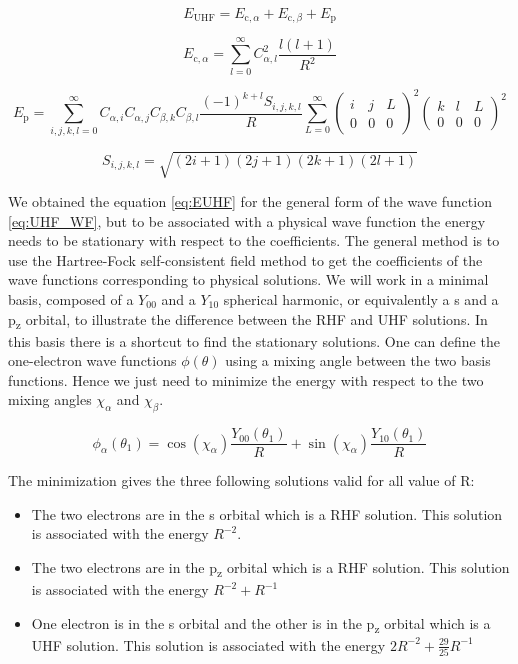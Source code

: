 \documentclass[11pt,a4paper]{article}
\begin{document}
\begin{equation}
E_{\text{UHF}} = E_{\text{c},\alpha} + E_{\text{c},\beta} + E_{\text{p}}
\end{equation}

\begin{equation}
E_{\text{c},\alpha} = \sum\limits_{l=0}^{\infty} C_{\alpha,l}^2 \frac{l(l+1)}{R^2}
\end{equation}

\begin{equation}
E_{\text{p}} = \sum\limits_{i,j,k,l=0}^{\infty}C_{\alpha,i}C_{\alpha,j}C_{\beta,k}C_{\beta,l} \frac{(-1)^{k+l}S_{i,j,k,l}}{R}\sum\limits_{L=0}^{\infty} \begin{pmatrix}
 i & j & L \\
 0 & 0 & 0
\end{pmatrix}^2 \begin{pmatrix}
 k & l & L \\
 0 & 0 & 0
\end{pmatrix}^2
\label{eq:EUHF}
\end{equation}

\begin{equation*}
S_{i,j,k,l}=\sqrt{(2i+1)(2j+1)(2k+1)(2l+1)}
\end{equation*}

We obtained the equation \eqref{eq:EUHF} for the general form of the wave function \eqref{eq:UHF_WF}, but to be associated with a physical wave function the energy needs to be stationary with respect to the coefficients. The general method is to use the Hartree-Fock self-consistent field method \cite{SzaboBook} to get the coefficients of the wave functions corresponding to physical solutions. We will work in a minimal basis, composed  of a $Y_{00}$ and a $Y_{10}$ spherical harmonic, or equivalently a s and a p\textsubscript{z} orbital, to illustrate the difference between the RHF and UHF solutions. In this basis there is a shortcut to find the stationary solutions. One can define the one-electron wave functions $\phi(\theta)$ using a mixing angle between the two basis functions. Hence we just need to minimize the energy with respect to the two mixing angles $\chi_\alpha$ and $\chi_\beta$.

\begin{equation}
\phi_\alpha(\theta_1)= \cos(\chi_\alpha)\frac{Y_{00}(\theta_1)}{R} + \sin(\chi_\alpha)\frac{Y_{10}(\theta_1)}{R}
\end{equation}
 
The minimization gives the three following solutions valid for all value of R:
\begin{itemize}
\item The two electrons are in the s orbital which is a RHF solution. This solution is associated with the energy $R^{-2}$.
\item The two electrons are in the p\textsubscript{z} orbital which is a RHF solution. This solution is associated with the energy $R^{-2} + R^{-1}$
\item One electron is in the s orbital and the other is in the p\textsubscript{z} orbital which is a UHF solution. This solution is associated with the energy $2R^{-2}+\frac{29}{25}R^{-1}$
\end{itemize}
\end{document}
